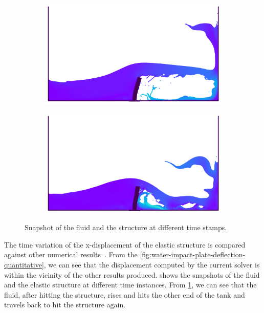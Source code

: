 \begin{figure}[H]
  \begin{subfigure}{0.48\textwidth}
    \centering
        \includegraphics[scale=0.5]{figures/fsi/figures/sun_2019_dam_breaking_flow_impacting_an_elastic_plate/snap_t_3.png}
  \end{subfigure}

  \begin{subfigure}{0.48\textwidth}
    \centering
    \includegraphics[scale=0.5]{figures/fsi/figures/sun_2019_dam_breaking_flow_impacting_an_elastic_plate/snap_t_4.png}
  \end{subfigure}
    \caption
    {
        Snapshot of the fluid and the structure at different time stamps.
    }
    \label{fig:dam-breaking-onto-plate-snapshot}
\end{figure}
The time variation of the x-displacement of the elastic structure is compared
against other numerical results~\parencite{sun2019fully,bogaers2016evaluation}. From
the \cref{fig:water-impact-plate-deflection-quantitative}, we can see that the
displacement computed by the current solver is within the vicinity of the other
results produced.  shows the
snapshots of the fluid and the elastic structure at different time instances.
From \cref{fig:dam-breaking-onto-plate-snapshot}, we can see that the fluid,
after hitting the structure, rises and hits the other end of the tank and
travels back to hit the structure again.


